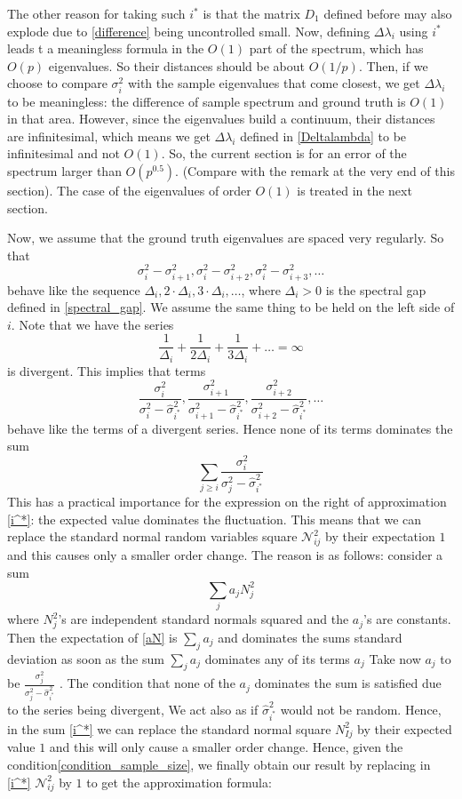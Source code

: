 \documentclass[12pt]{amsart}
\theoremstyle{definition}
\numberwithin{equation}{section}
\numberwithin{equation}{section}
\theoremstyle{remark}
\numberwithin{equation}{section}
\begin{document}
The other reason for taking such $i^*$ is that the matrix $D_1$ defined before may also explode due to \ref{difference} being uncontrolled small. Now, defining $\Delta\lambda_i$ using $i^*$ leads t a meaningless formula in the $O(1)$ part of the spectrum, which has $O(p)$ eigenvalues. So their distances should be about $O(1/p)$. Then, if we choose to compare $\sigma^2_i$ with the sample eigenvalues that come closest, we get $\Delta\lambda_i$ to be meaningless: the difference of sample spectrum and ground truth is $O(1)$ in that area. However, since the eigenvalues build a continuum, their distances are infinitesimal, which means we get
$\Delta\lambda_i$ defined in \ref{Deltalambda} to be infinitesimal and not $O(1)$. So, the current section is for an error of the spectrum larger than $O(p^{0.5})$. (Compare with the remark at the very  end of this section). The case of the eigenvalues of order $O(1)$ is treated in the next section.
	
	Now, we assume that the ground truth eigenvalues are spaced very regularly. So that
	$$\sigma^2_i-\sigma^2_{i+1},\sigma^2_{i}-\sigma^2_{i+2},\sigma^2_{i}-\sigma^2_{i+3},\ldots$$
	behave like the sequence
	$\Delta_i,2\cdot\Delta_i,3\cdot \Delta_i,\ldots$, where $\Delta_i>0$ is the spectral gap defined in \ref{spectral_gap}. We assume the same thing to be held
	on the left side of $i$.  Note that we have
	the series
	$$\frac{1}{\Delta_i}+\frac{1}{2\Delta_i}+\frac{1}{3\Delta_i}+\ldots=\infty$$
is divergent. This implies that terms
$$\frac{\sigma_{i}^2}{\sigma_{i}^2-\hat{\sigma}^2_{i^*}},\frac{\sigma_{i+1}^2}{\sigma_{i+1}^2-\hat{\sigma}^2_{i^*}},\frac{\sigma_{i+2}^2}{\sigma_{i+2}^2-\hat{\sigma}^2_{i^*}},\ldots$$
behave like the terms of a  divergent series. Hence none of its terms dominates the sum
$$\sum_{j\geq i}\frac{\sigma_{i}^2}{\sigma_{j}^2-\hat{\sigma}^2_{i^*}}$$
This has a practical importance for the expression on the right of approximation \ref{i^*}: the expected value
dominates the fluctuation. This means that we can replace the standard normal random variables square $\mathcal{N}^2_{ij}$  by their expectation $1$
and this causes only a smaller order change. The reason is as follows:
consider a sum
\begin{equation}
\label{aN}
\sum_ja_jN_j^2
\end{equation}
where $N_j^2$'s are independent standard normals squared and the $a_j$'s are constants.
Then the expectation of \ref{aN} is $\sum_ja_j$ and dominates the sums standard deviation
as soon as the sum $\sum_j a_j$ dominates any of its terms $a_j$ Take now $a_j$ to be
$\frac{\sigma_{j}^2}{\sigma_{j}^2-\hat{\sigma}^2_{i^*}}$ . The condition that none of the $a_j$ dominates
the sum is satisfied due to the series being divergent, We act also as if $\hat{\sigma}^2_{i^*}$
would not be random. Hence, in the sum \ref{i^*} we can replace the standard normal square $N_{Ij}^2$
by their expected value $1$ and this will only cause a smaller order change. Hence, given the condition\ref{condition_sample_size}, we finally obtain our result by replacing in \ref{i^*} $\mathcal{N}^2_{ij}$ by $1$
to  get the approximation formula:
\end{document}
